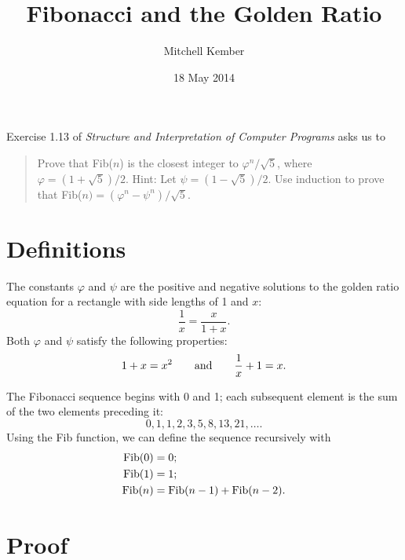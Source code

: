 \documentclass{article}
\title{Fibonacci and the Golden Ratio}
\author{Mitchell Kember}
\date{18 May 2014}
\begin{document}
\maketitle

\noindent Exercise 1.13 of \emph{Structure and Interpretation of Computer Programs} asks us to
\begin{quote}
Prove that Fib(\(n\)) is the closest integer to \(\varphi^n/\sqrt{5}\), where \(\varphi=(1+\sqrt{5})/2\). Hint: Let \(\psi=(1-\sqrt{5})/2\). Use induction to prove that Fib(\(n)=(\varphi^n-\psi^n)/\sqrt{5}\).
\end{quote}

\section*{Definitions}

The constants \(\varphi\) and \(\psi\) are the positive and negative solutions to the golden ratio equation for a rectangle with side lengths of 1 and \(x\): \[\frac1x=\frac{x}{1+x}.\] Both \(\varphi\) and \(\psi\) satisfy the following properties: \[1+x=x^2 \qquad \textup{and} \qquad \frac1x + 1 = x.\]

The Fibonacci sequence begins with 0 and 1; each subsequent element is the sum of the two elements preceding it: \[0, 1, 1, 2, 3, 5, 8, 13, 21, \dots.\] Using the Fib function, we can define the sequence recursively with
\begin{align*}
\textup{Fib}(0) &= 0;\\
\textup{Fib}(1) &= 1;\\
\textup{Fib}(n) &= \textup{Fib}(n-1) + \textup{Fib}(n-2).
\end{align*}

\section*{Proof}
\end{document}
